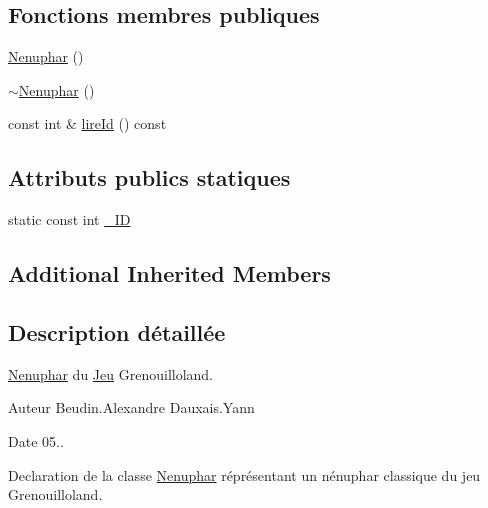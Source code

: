 \subsection*{Fonctions membres publiques}
\begin{DoxyCompactItemize}
\item 
\hyperlink{classgrenouilloland_1_1Nenuphar_a12e7485c4b6bd9b44f5a835df85bb8bf}{Nenuphar} ()
\item 
\hyperlink{classgrenouilloland_1_1Nenuphar_a0e9471731c8b2763b5ec01e2ad5f20fb}{$\sim$\-Nenuphar} ()
\item 
const int \& \hyperlink{classgrenouilloland_1_1Nenuphar_a3a77c3463dd389cf0eee275ee96a7939}{lire\-Id} () const 
\end{DoxyCompactItemize}
\subsection*{Attributs publics statiques}
\begin{DoxyCompactItemize}
\item 
static const int \hyperlink{classgrenouilloland_1_1Nenuphar_a048ada427d4e142923609003ad468c66}{\-\_\-\-I\-D}
\end{DoxyCompactItemize}
\subsection*{Additional Inherited Members}


\subsection{Description détaillée}
\hyperlink{classgrenouilloland_1_1Nenuphar}{Nenuphar} du \hyperlink{classgrenouilloland_1_1Jeu}{Jeu} Grenouilloland. 

\begin{DoxyAuthor}{Auteur}
Beudin.\-Alexandre Dauxais.\-Yann 
\end{DoxyAuthor}
\begin{DoxyDate}{Date}
05..
\end{DoxyDate}
Declaration de la classe \hyperlink{classgrenouilloland_1_1Nenuphar}{Nenuphar} réprésentant un nénuphar classique du jeu Grenouilloland. 

